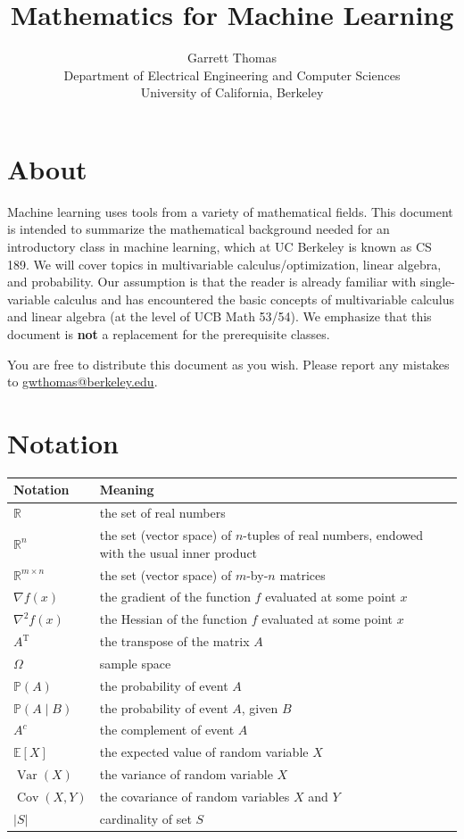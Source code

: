 \documentclass{article}
\title{Mathematics for Machine Learning}
\author{Garrett Thomas\\
Department of Electrical Engineering and Computer Sciences\\
University of California, Berkeley}
\newcommand{\R}{\mathbb{R}}
\newcommand{\tran}{^\text{T}}
\newcommand{\pr}[1]{\mathbb{P}(#1)}
\newcommand{\ev}[1]{\mathbb{E}[#1]}
\newcommand{\var}[1]{\operatorname{Var}(#1)}
\newcommand{\cov}[2]{\operatorname{Cov}(#1, #2)}
\begin{document}
\maketitle

\section{About}
Machine learning uses tools from a variety of mathematical fields. This document is intended to summarize the mathematical background needed for an introductory class in machine learning, which at UC Berkeley is known as CS 189. We will cover topics in multivariable calculus/optimization, linear algebra, and probability. Our assumption is that the reader is already familiar with single-variable calculus and has encountered the basic concepts of multivariable calculus and linear algebra (at the level of UCB Math 53/54). We emphasize that this document is \textbf{not} a replacement for the prerequisite classes.

You are free to distribute this document as you wish. Please report any mistakes to \url{gwthomas@berkeley.edu}.

\newpage
\tableofcontents

\newpage
\section{Notation}
\begin{tabular}{|l|l|}
\hline
Notation & Meaning \\
\hline
$\R$ & the set of real numbers \\
$\R^n$ & the set (vector space) of $n$-tuples of real numbers, endowed with the usual inner product \\
$\R^{m \times n}$ & the set (vector space) of $m$-by-$n$ matrices \\
$\nabla f(x)$ & the gradient of the function $f$ evaluated at some point $x$ \\
$\nabla^2 f(x)$ & the Hessian of the function $f$ evaluated at some point $x$ \\
$A\tran$ & the transpose of the matrix $A$ \\
$\Omega$ & sample space \\
$\pr{A}$ & the probability of event $A$ \\
$\pr{A \mid B}$ & the probability of event $A$, given $B$ \\
$A^c$ & the complement of event $A$ \\
$\ev{X}$ & the expected value of random variable $X$ \\
$\var{X}$ & the variance of random variable $X$ \\
$\cov{X}{Y}$ & the covariance of random variables $X$ and $Y$ \\
$|S|$ & cardinality of set $S$ \\
\hline
\end{tabular}
\end{document}
